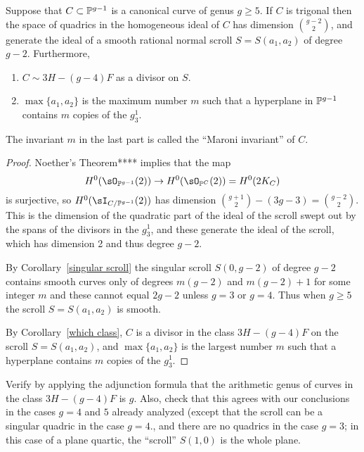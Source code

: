 \begin{theorem}
Suppose that $C\subset \PP^{g-1}$ is a canonical curve of genus $g\geq 5$. If $C$ is trigonal then the space of quadrics in the homogeneous ideal of $C$ has dimension ${g-2 \choose 2}$, and generate the ideal of a smooth rational normal scroll $S = S(a_1,a_2)$ of degree $g-2$. Furthermore,
\begin{enumerate}
\item $C\sim 3H -(g-4)F$ as a divisor on $S$.
\item $\max\{a_1,a_2\}$ is the maximum number $m$ such that a hyperplane in $\PP^{g-1}$ contains $m$ copies of the $g^1_3$. 
\end{enumerate}
\end{theorem}

The invariant $m$ in the last part is called the ``Maroni invariant'' of $C$.

\begin{proof}
Noether's Theorem****  implies that the map
$$
H^0(\sO_{\PP^{g-1}}(2)) \to H^0(\sO_{\PP^{C}}(2)) = H^0(2K_C)
$$
is surjective, so $H^0(\sI_{C/\PP^{g-1}}(2))$ has dimension ${g+1\choose 2} - (3g-3) = {g-2\choose 2}$. This is the dimension of the quadratic part
of the ideal of the scroll swept out by the spans of the divisors in the $g^1_3$, and these generate the ideal of the scroll, which has dimension 2 and thus
degree $g-2$.

By Corollary~\ref{singular scroll} the singular scroll $S(0,g-2)$ of degree $g-2$ contains smooth curves only of degrees $m(g-2)$ and $m(g-2)+1$ for
some integer $m$ and these
cannot equal $2g-2$ unless $g= 3$ or $g=4$. Thus when $g\geq 5$ the scroll $S = S(a_1,a_2)$ is  smooth.

By Corollary~\ref{which class}, $C$ is a divisor in the class $3H-(g-4)F$ on the scroll $S = S(a_1,a_2)$, and $\max\{a_1, a_2\}$ is the largest
number $m$ such that a hyperplane contains $m$ copies of the $g^1_3$. 
\end{proof}

\begin{exercise}
Verify by applying the adjunction formula that the arithmetic genus of curves in the class $3H-(g-4)F$ is $g$. Also, check that this agrees with our conclusions in the cases $g = 4$ and $5$ already analyzed (except that the scroll can be a singular quadric in the case $g=4$., and there are no
quadrics in the case $g=3$; in this case of a plane quartic, the ``scroll'' $S(1,0)$ is the whole plane.
\end{exercise}

